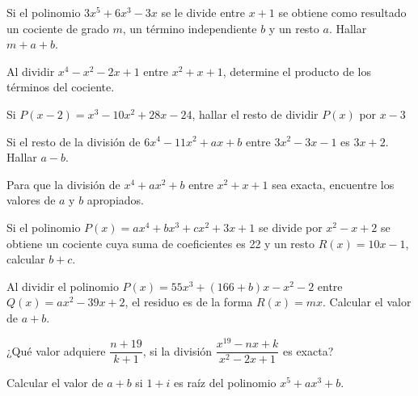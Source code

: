 \showLine
\begin{multicols}{2}
    \begin{problem}
        Si el polinomio $3x^5 + 6x^3 - 3x$ se le divide entre $x + 1$ se obtiene como resultado un cociente de grado $m$, un término independiente $b$ y un resto $a$.
        Hallar $m + a + b$.
    \end{problem}

    \begin{problem}
        Al dividir $x^4 - x^2 - 2x + 1$ entre $x^2 + x + 1$, determine el producto de los términos del cociente.
    \end{problem}

    \begin{problem}
        Si $P(x - 2) = x^3 - 10x^2 + 28x - 24$, hallar el resto de dividir $P(x)$ por $x - 3$
    \end{problem}

    \begin{problem}
        Si el resto de la división de $6x^4 - 11x^2 + ax + b$ entre $3x^2 - 3x - 1$ es $3x + 2$.
        Hallar $a - b$.
    \end{problem}

    \begin{problem}
        Para que la división de $x^4 + ax^2 + b$ entre $x^2 + x + 1$ sea exacta, encuentre los valores de $a$ y $b$ apropiados.
    \end{problem}

    \begin{problem}
        Si el polinomio $P(x) = ax^4 + bx^3 + cx^2 + 3x + 1$ se divide por $x^2 - x + 2$ se obtiene un cociente cuya suma de coeficientes es 22 y un resto $R(x) = 10x - 1$, calcular $b + c$.
    \end{problem}

    \begin{problem}
        Al dividir el polinomio $P(x) = 55x^3 + (166 + b)x - x^2 - 2$ entre $Q(x) = ax^2 - 39x + 2$, el residuo es de la forma $R(x) = mx$.
        Calcular el valor de $a + b$.
    \end{problem}

    \begin{problem}
        ¿Qué valor adquiere $\dfrac{n + 19}{k + 1}$, si la división $\dfrac{x^{19} - nx + k}{x^2 - 2x + 1}$ es exacta?
    \end{problem}

    \begin{problem}
        Calcular el valor de $a + b$ si $1 + i$ es raíz del polinomio $x^5 + ax^3 + b$.
    \end{problem}


\end{multicols}

